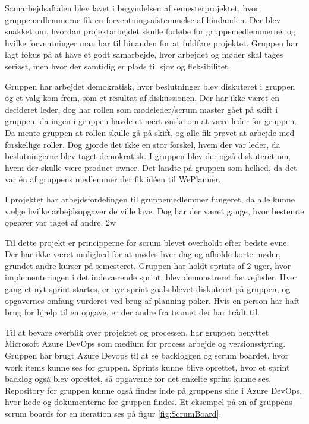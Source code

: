 Samarbejdsaftalen blev lavet i begyndelsen af semesterprojektet, hvor gruppemedlemmerne fik en forventningsafstemmelse af hindanden.  Der blev snakket om, hvordan projektarbejdet skulle forløbe for gruppemedlemmerne, og hvilke forventninger man har til hinanden for at fuldføre projektet. Gruppen har lagt fokus på at have et godt samarbejde, hvor arbejdet og møder skal tages seriøst, men hvor der samtidig er plads til sjov og fleksibilitet.

Gruppen har arbejdet demokratisk, hvor beslutninger blev diskuteret i gruppen og et valg kom frem, som et resultat af diskussionen. Der har ikke været en decideret leder, dog har rollen som mødeleder/scrum master gået på skift i gruppen, da ingen i gruppen havde et nært ønske om at være leder for gruppen. Da mente gruppen at rollen skulle gå på skift, og alle fik prøvet at arbejde med forskellige roller. Dog gjorde det ikke en stor forskel, hvem der var leder, da beslutningerne blev taget demokratisk. I gruppen blev der også diskuteret om, hvem der skulle være product owner. Det landte på gruppen som helhed, da det var én af gruppens medlemmer der fik idéen til WePlanner.  

I projektet har arbejdsfordelingen til gruppemedlemmer fungeret, da alle kunne vælge hvilke arbejdsopgaver de ville lave. Dog har der været gange, hvor bestemte opgaver var taget af andre. 2w

Til dette projekt er principperne for scrum \cite{Scrum} blevet overholdt efter bedste evne. Der har ikke været mulighed for at mødes hver dag og afholde korte møder, grundet andre kurser på semesteret. Gruppen har holdt sprints af 2 uger, hvor implementeringen i det indeværende sprint,  blev demonstreret for vejleder. Hver gang et nyt sprint startes, er nye sprint-goals blevet diskuteret på gruppen, og opgavernes omfang vurderet ved brug af planning-poker. Hvis en person har haft brug for hjælp til en opgave, er der andre fra teamet der har trådt til.

Til at bevare overblik over projektet og processen, har gruppen benyttet Microsoft Azure DevOps \cite{AzureDevOps} som medium for process arbejde og versionsstyring. Gruppen har brugt Azure Devops  til at se backloggen og scrum boardet, hvor work items kunne ses for gruppen. Sprints kunne blive oprettet, hvor et sprint backlog også blev oprettet, så opgaverne for det enkelte sprint kunne ses. Repository for gruppen kunne også findes inde på gruppens side i Azure DevOps, hvor kode og dokumenterne for gruppen findes. Et eksempel på en af gruppens scrum boards for en iteration ses på figur \ref{fig:ScrumBoard}. 

